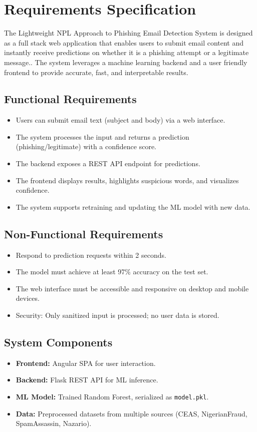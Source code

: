 \documentclass{article}
\begin{document}
\section{Requirements Specification}

The Lightweight NPL Approach to Phishing Email Detection System is designed as a full stack web application that enables users to submit email content and instantly receive predictions on whether it is a phishing attempt or a legitimate message.. The system leverages a machine learning backend and a user friendly frontend to provide accurate, fast, and interpretable results.

\subsection{Functional Requirements}
\begin{itemize}
    \item Users can submit email text (subject and body) via a web interface.
    \item The system processes the input and returns a prediction (phishing/legitimate) with a confidence score.
    \item The backend exposes a REST API endpoint for predictions.
    \item The frontend displays results, highlights suspicious words, and visualizes confidence.
    \item The system supports retraining and updating the ML model with new data.
\end{itemize}

\subsection{Non-Functional Requirements}
\begin{itemize}
    \item Respond to prediction requests within 2 seconds.
    \item The model must achieve at least 97\% accuracy on the test set.
    \item The web interface must be accessible and responsive on desktop and mobile devices.
    \item Security: Only sanitized input is processed; no user data is stored.
\end{itemize}

\subsection{System Components}
\begin{itemize}
    \item \textbf{Frontend:} Angular SPA for user interaction.
    \item \textbf{Backend:} Flask REST API for ML inference.
    \item \textbf{ML Model:} Trained Random Forest, serialized as \texttt{model.pkl}.
    \item \textbf{Data:} Preprocessed datasets from multiple sources (CEAS, NigerianFraud, SpamAssassin, Nazario).
\end{itemize}
\newpage
\end{document}
